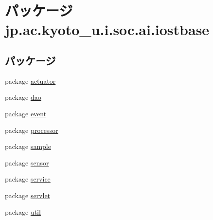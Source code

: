 \hypertarget{namespacejp_1_1ac_1_1kyoto__u_1_1i_1_1soc_1_1ai_1_1iostbase}{\section{パッケージ jp.\-ac.\-kyoto\-\_\-u.\-i.\-soc.\-ai.\-iostbase}
\label{namespacejp_1_1ac_1_1kyoto__u_1_1i_1_1soc_1_1ai_1_1iostbase}
}
\subsection*{パッケージ}
\begin{DoxyCompactItemize}
\item 
package \hyperlink{namespacejp_1_1ac_1_1kyoto__u_1_1i_1_1soc_1_1ai_1_1iostbase_1_1actuator}{actuator}
\item 
package \hyperlink{namespacejp_1_1ac_1_1kyoto__u_1_1i_1_1soc_1_1ai_1_1iostbase_1_1dao}{dao}
\item 
package \hyperlink{namespacejp_1_1ac_1_1kyoto__u_1_1i_1_1soc_1_1ai_1_1iostbase_1_1event}{event}
\item 
package \hyperlink{namespacejp_1_1ac_1_1kyoto__u_1_1i_1_1soc_1_1ai_1_1iostbase_1_1processor}{processor}
\item 
package \hyperlink{namespacejp_1_1ac_1_1kyoto__u_1_1i_1_1soc_1_1ai_1_1iostbase_1_1sample}{sample}
\item 
package \hyperlink{namespacejp_1_1ac_1_1kyoto__u_1_1i_1_1soc_1_1ai_1_1iostbase_1_1sensor}{sensor}
\item 
package \hyperlink{namespacejp_1_1ac_1_1kyoto__u_1_1i_1_1soc_1_1ai_1_1iostbase_1_1service}{service}
\item 
package \hyperlink{namespacejp_1_1ac_1_1kyoto__u_1_1i_1_1soc_1_1ai_1_1iostbase_1_1servlet}{servlet}
\item 
package \hyperlink{namespacejp_1_1ac_1_1kyoto__u_1_1i_1_1soc_1_1ai_1_1iostbase_1_1util}{util}
\end{DoxyCompactItemize}

